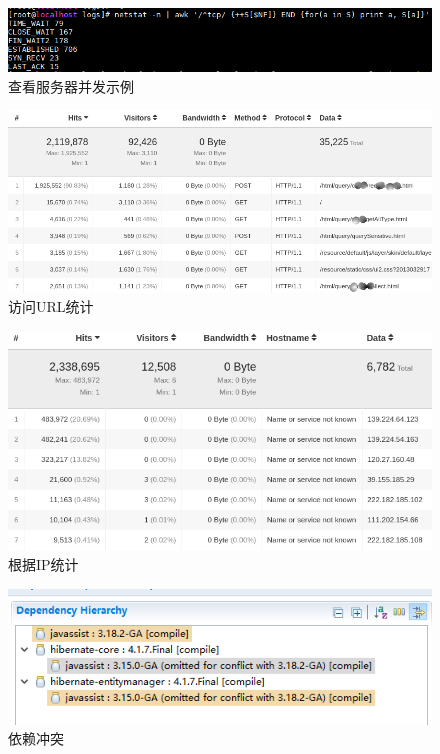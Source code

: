 \documentclass[8pt]{book}
\numberwithin{dummy}{section}
\theoremstyle{ocrenumbox}
\theoremstyle{blacknumex}
\theoremstyle{blacknumbox}
\theoremstyle{ocrenum}
\begin{document}
\begin{figure}[htbp]
	\centering
	\includegraphics[scale=0.5]{websiteconcurrentaccess.png}
	\caption{查看服务器并发示例}
	\label{fig:websiteconcurrentaccess}
\end{figure}

\begin{figure}[htbp]
	\centering
	\includegraphics[scale=0.35]{spideranalysis.png}
	\caption{访问URL统计}
	\label{fig:spideranalysis}
\end{figure}

\begin{figure}[htbp]
	\centering
	\includegraphics[scale=0.4]{ipstatistics.png}
	\caption{根据IP统计}
	\label{fig:ipstatistics}
\end{figure}

\begin{figure}[htbp]
	\centering
	\includegraphics[scale=0.7]{dependencyconflict.png}
	\caption{依赖冲突}
	\label{fig:dependencyconflict}
\end{figure}
\end{document}
